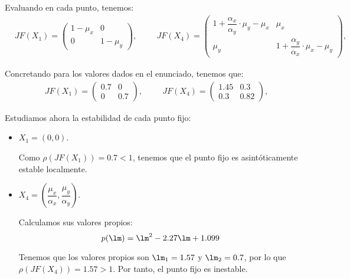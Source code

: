 \begin{ejercicio}
    Evaluando en cada punto, tenemos:
    \begin{align*}
        &JF(X_1) = \begin{pmatrix}
            1-\mu_x & 0\\
            0 & 1-\mu_y
        \end{pmatrix},\hspace{1cm}
        JF(X_4) = \begin{pmatrix}
            1+\dfrac{\alpha_x}{\alpha_y}\cdot \mu_y - \mu_x & \mu_x\\
            \mu_y & 1+\dfrac{\alpha_y}{\alpha_x}\cdot \mu_x - \mu_y
        \end{pmatrix},
    \end{align*}

    Concretando para los valores dados en el enunciado, tenemos que:
    \begin{align*}
        &JF(X_1) = \begin{pmatrix}
            0.7 & 0\\
            0 & 0.7
        \end{pmatrix},\hspace{1cm}
        JF(X_4) = \begin{pmatrix}
            1.45 & 0.3\\
            0.3 & 0.82
        \end{pmatrix},
    \end{align*}

    Estudiamos ahora la estabilidad de cada punto fijo:
    \begin{itemize}
        \item $X_1=(0,0)$.
        
        Como $\rho(JF(X_1)) = 0.7<1$, tenemos que el punto fijo es asintóticamente estable localmente.

        \item $X_4=\left(\dfrac{\mu_x}{\alpha_x},\dfrac{\mu_y}{\alpha_y}\right)$.
        
        Calculamos sus valores propios:
        \begin{equation*}
            p(\lm) = \lm^2 - 2.27\lm + 1.099
        \end{equation*}

        Tenemos que los valores propios son $\lm_1=1.57$ y $\lm_2=0.7$,
        por lo que $\rho(JF(X_4)) =1.57>1$. Por tanto, el punto fijo es inestable.
    \end{itemize}
\end{ejercicio}

